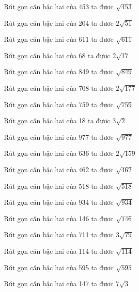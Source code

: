 \documentclass[12pt,a4paper]{article}
\begin{document}
\begin{ex}
Rút gọn căn bậc hai của 453 ta đươc $\sqrt{453}$
\end{ex}
\begin{ex}
Rút gọn căn bậc hai của 204 ta đươc $2\sqrt{51}$
\end{ex}
\begin{ex}
Rút gọn căn bậc hai của 611 ta đươc $\sqrt{611}$
\end{ex}
\begin{ex}
Rút gọn căn bậc hai của 68 ta đươc $2\sqrt{17}$
\end{ex}
\begin{ex}
Rút gọn căn bậc hai của 849 ta đươc $\sqrt{849}$
\end{ex}
\begin{ex}
Rút gọn căn bậc hai của 708 ta đươc $2\sqrt{177}$
\end{ex}
\begin{ex}
Rút gọn căn bậc hai của 759 ta đươc $\sqrt{759}$
\end{ex}
\begin{ex}
Rút gọn căn bậc hai của 18 ta đươc $3\sqrt{2}$
\end{ex}
\begin{ex}
Rút gọn căn bậc hai của 977 ta đươc $\sqrt{977}$
\end{ex}
\begin{ex}
Rút gọn căn bậc hai của 636 ta đươc $2\sqrt{159}$
\end{ex}
\begin{ex}
Rút gọn căn bậc hai của 462 ta đươc $\sqrt{462}$
\end{ex}
\begin{ex}
Rút gọn căn bậc hai của 518 ta đươc $\sqrt{518}$
\end{ex}
\begin{ex}
Rút gọn căn bậc hai của 934 ta đươc $\sqrt{934}$
\end{ex}
\begin{ex}
Rút gọn căn bậc hai của 146 ta đươc $\sqrt{146}$
\end{ex}
\begin{ex}
Rút gọn căn bậc hai của 711 ta đươc $3\sqrt{79}$
\end{ex}
\begin{ex}
Rút gọn căn bậc hai của 114 ta đươc $\sqrt{114}$
\end{ex}
\begin{ex}
Rút gọn căn bậc hai của 595 ta đươc $\sqrt{595}$
\end{ex}
\begin{ex}
Rút gọn căn bậc hai của 147 ta đươc $7\sqrt{3}$
\end{ex}
\end{document}
